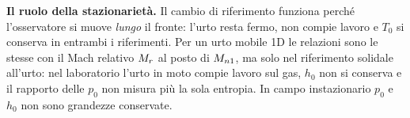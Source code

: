 \textbf{Il ruolo della stazionarietà.} Il cambio di riferimento funziona perché l'osservatore si muove \emph{lungo}
il fronte: l'urto resta fermo, non compie lavoro e $T_0$ si conserva in entrambi i riferimenti. Per un urto mobile
1D le relazioni sono le stesse con il Mach relativo $M_{r}$ al posto di $M_{n1}$, ma solo nel riferimento solidale
all'urto: nel laboratorio l'urto in moto compie lavoro sul gas, $h_0$ non si conserva e il rapporto delle $p_0$ non
misura più la sola entropia. In campo instazionario $p_0$ e $h_0$ non sono grandezze conservate.


